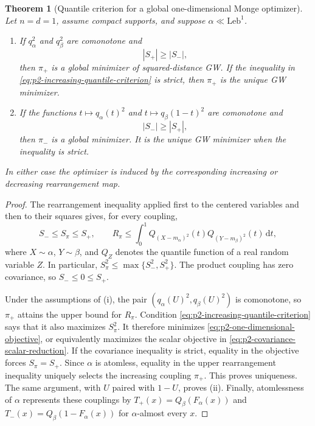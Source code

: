 \documentclass[11pt,a4paper]{article}
\newtheorem{theorem}{Theorem}[section]
\theoremstyle{definition}
\theoremstyle{remark}
\newcommand{\dd}{\,\mathrm d}
\newcommand{\abs}[1]{\left\lvert #1\right\rvert}
\begin{document}
\begin{theorem}[Quantile criterion for a global one-dimensional Monge optimizer]
\label{thm:p2-one-dimensional-quantile-monge}
Let \(n=d=1\), assume compact supports, and suppose
\(\alpha\ll\mathrm{Leb}^1\).
\begin{enumerate}[label=\textup{(\roman*)}]
  \item If \(q_\alpha^2\) and \(q_\beta^2\) are comonotone and
  \begin{equation}
    \abs{S_+}\geq\abs{S_-},
    \label{eq:p2-increasing-quantile-criterion}
  \end{equation}
  then \(\pi_+\) is a global minimizer of squared-distance GW.  If the
  inequality in \eqref{eq:p2-increasing-quantile-criterion} is strict, then
  \(\pi_+\) is the unique GW minimizer.

  \item If the functions \(t\mapsto q_\alpha(t)^2\) and
  \(t\mapsto q_\beta(1-t)^2\) are comonotone and
  \begin{equation}
    \abs{S_-}\geq\abs{S_+},
    \label{eq:p2-decreasing-quantile-criterion}
  \end{equation}
  then \(\pi_-\) is a global minimizer.  It is the unique GW minimizer when
  the inequality is strict.
\end{enumerate}
In either case the optimizer is induced by the corresponding increasing or
decreasing rearrangement map.
\end{theorem}

\begin{proof}
The rearrangement inequality applied first to the centered variables and
then to their squares gives, for every coupling,
\begin{equation}
  S_-\leq S_\pi\leq S_+,
  \qquad
  R_\pi\leq
  \int_0^1 Q_{(X-m_\alpha)^2}(t)
               Q_{(Y-m_\beta)^2}(t)\dd t,
  \label{eq:p2-one-dimensional-rearrangement-bounds}
\end{equation}
where \(X\sim\alpha\), \(Y\sim\beta\), and \(Q_Z\) denotes the quantile
function of a real random variable \(Z\).  In particular,
\(
 S_\pi^2\leq\max\{S_-^2,S_+^2\}
\).
The product coupling has zero covariance, so \(S_-\leq0\leq S_+\).

Under the assumptions of \textup{(i)}, the pair
\((q_\alpha(U)^2,q_\beta(U)^2)\) is comonotone, so \(\pi_+\) attains the
upper bound for \(R_\pi\).  Condition
\eqref{eq:p2-increasing-quantile-criterion} says that it also maximizes
\(S_\pi^2\).  It therefore minimizes \eqref{eq:p2-one-dimensional-objective},
or equivalently maximizes the scalar objective in
\eqref{eq:p2-covariance-scalar-reduction}.
If the covariance inequality is strict, equality in the objective forces
\(S_\pi=S_+\).  Since \(\alpha\) is atomless, equality in the upper
rearrangement inequality uniquely selects the increasing coupling \(\pi_+\).
This proves uniqueness.  The same argument, with \(U\) paired with \(1-U\),
proves \textup{(ii)}.  Finally, atomlessness of \(\alpha\) represents these
couplings by
\(
 T_+(x)=Q_\beta(F_\alpha(x))
\)
and
\(
 T_-(x)=Q_\beta(1-F_\alpha(x))
\)
for \(\alpha\)-almost every \(x\).
\end{proof}
\end{document}
